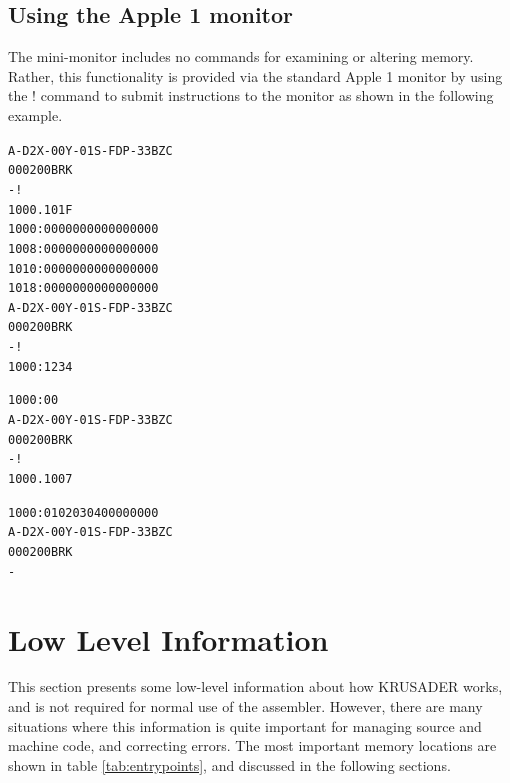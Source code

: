 \documentclass[12pt]{article}
\newcommand{\replica}[1]{\textsf{#1}}
\newcommand{\krusader}{\textsf{KRUSADER}\xspace}
\begin{document}
\subsection{Using the Apple 1 monitor}

The mini-monitor includes no commands for examining or altering memory. Rather, this functionality
is provided via the standard Apple 1 monitor by using the \replica{!} command to submit instructions to the
monitor as shown in the following example.
\begin{alltt}
A-D2 X-00 Y-01 S-FD P-33 BZC
0002   00          BRK
-!
1000.101F
1000: 00 00 00 00 00 00 00 00
1008: 00 00 00 00 00 00 00 00
1010: 00 00 00 00 00 00 00 00
1018: 00 00 00 00 00 00 00 00
A-D2 X-00 Y-01 S-FD P-33 BZC
0002   00          BRK
-!
1000:1 2 3 4

1000: 00
A-D2 X-00 Y-01 S-FD P-33 BZC
0002   00          BRK
-!
1000.1007

1000: 01 02 03 04 00 00 00 00
A-D2 X-00 Y-01 S-FD P-33 BZC
0002   00          BRK
-
\end{alltt}

\pagebreak

\section{Low Level Information}

This section presents some low-level information about how \krusader works,
and is not required for normal use of the assembler.  However, there are many situations
where this information is quite important for managing source and machine code, and correcting
errors. The most important memory locations are shown in table \ref{tab:entrypoints}, and discussed in the following sections.
\end{document}
